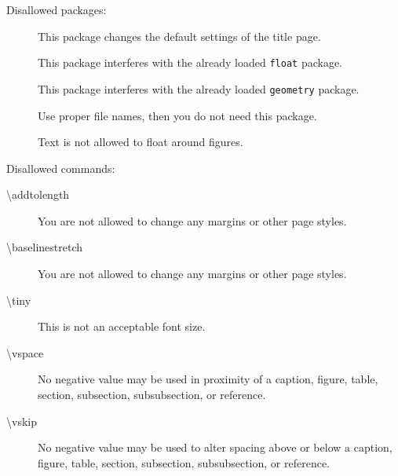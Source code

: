 \documentclass[
    language=english, %
    thesis=bachelor, %
    supervisor=postdoc, %
    multiauthor=false, %
    ]{settings/csssa-thesis}
\begin{document}
Disallowed packages:
\begin{description}
    \item[] This package changes the default settings of the title page.
    \item[] This package interferes with the already loaded \texttt{float} package.
    \item[] This package interferes with the already loaded \texttt{geometry} package.
    \item[] Use proper file names, then you do not need this package.
    \item[] Text is not allowed to float around figures.
\end{description}

Disallowed commands:
\begin{description}
    \item[\textbackslash{}addtolength] You are not allowed to change any margins or other page styles.
    \item[\textbackslash{}baselinestretch] You are not allowed to change any margins or other page styles.
    \item[\textbackslash{}tiny] This is not an acceptable font size.
    \item[\textbackslash{}vspace] No negative value may be used in proximity of a caption, figure, table, section, subsection, subsubsection, or reference.
    \item[\textbackslash{}vskip] No negative value may be used to alter spacing above or below a caption, figure, table, section, subsection, subsubsection, or reference.
\end{description}


\printbibliography[heading=header]
\backmatter     

\end{document}
